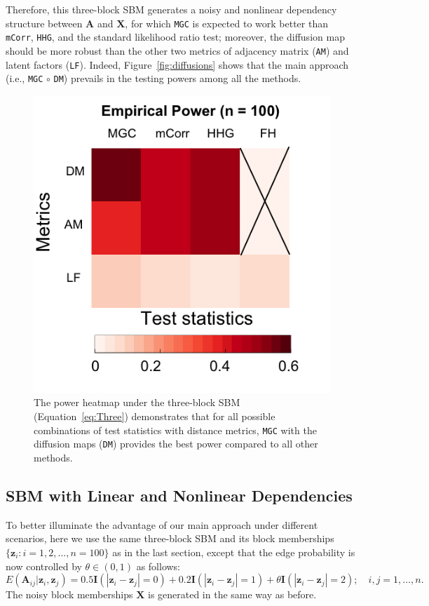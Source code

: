 \documentclass[11pt]{article}
\theoremstyle{definition}
\begin{document}
Therefore, this three-block SBM generates a noisy and nonlinear dependency structure between $\mathbf{A}$ and $\mathbf{X}$, for which \texttt{MGC} is expected to work better than \texttt{mCorr}, \texttt{HHG}, and the standard likelihood ratio test; moreover, the diffusion map should be more robust than the other two metrics of adjacency matrix (\texttt{AM}) and latent factors (\texttt{LF}). Indeed, Figure~\ref{fig:diffusions} shows that the main approach (i.e., \texttt{MGC} $\circ$ \texttt{DM}) prevails in the testing powers among all the methods.

\begin{figure}
	\centering
	\includegraphics[width=0.4\paperwidth, height=0.4\paperwidth]{../Figure/ThreeSBM_Elbow3.png}
	\caption{The power heatmap under the three-block SBM (Equation~\ref{eq:Three}) demonstrates that for all possible combinations of test statistics with distance metrics, \texttt{MGC} with the diffusion maps (\texttt{DM}) provides the best power compared to all other methods.}
	\label{fig:threeSBM}
\end{figure}

\subsection{SBM with Linear and Nonlinear Dependencies}

To better illuminate the advantage of our main approach under different scenarios, here we use the same three-block SBM and its block memberships $\{ \mathbf{z}_{i} : i=1,2, \ldots, n=100 \}$ as in the last section, except that the edge probability is now controlled by $\theta \in (0, 1)$ as follows:
\begin{equation}
E(\mathbf{A}_{ij} | \mathbf{z}_{i}, \mathbf{z}_{j}) = 0.5 \mathbf{I}(|\mathbf{z}_{i} - \mathbf{z}_{j}| = 0) + 0.2 \mathbf{I}(|\mathbf{z}_{i} - \mathbf{z}_{j}| = 1) + \theta \mathbf{I}(|\mathbf{z}_{i} - \mathbf{z}_{j}| = 2); \quad i,j = 1, \ldots, n.
\label{eq:mono}
\end{equation}
The noisy block memberships $\mathbf{X}$ is generated in the same way as before.
\end{document}
